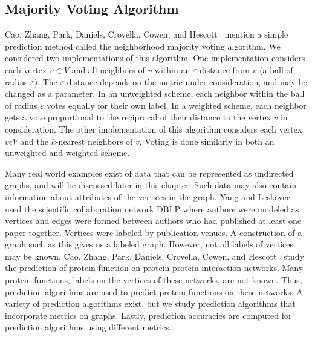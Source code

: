 \subsection{Majority Voting Algorithm}
Cao, Zhang, Park, Daniels, Crovella, Cowen, and Hescott~\cite{10.1371/journal.pone.0076339}
mention a simple prediction method called the neighborhood majority voting algorithm.
We considered two implementations of this algorithm. One implementation considers
each vertex $v \in V$ and all neighbors of $v$ within an $\varepsilon$ distance
from $v$ (a ball of radius $\varepsilon$). The $\varepsilon$ distance depends on the metric under consideration, and may be changed as a parameter. In an unweighted scheme, each neighbor within the ball of radius $\varepsilon$ votes equally for their own label. In a weighted scheme, each neighbor gets a vote proportional to the reciprocal of their distance to the vertex $v$ in consideration. The other implementation of this algorithm considers each vertex $v \epsilon V$ and the $k$-nearest neighbors of $v$. Voting is done similarly in both an unweighted and weighted scheme.




 Many real world examples exist of data that can be represented as undirected graphs, and will be discussed later in this chapter. Such data may also contain information about attributes of the vertices in the graph. Yang and Leskovec~\cite{DBLP:journals/corr/abs-1205-6233} used the scientific collaboration network DBLP where authors were modeled as vertices and edges were formed between authors who had published at least one paper together. Vertices were labeled by publication venues. A construction of a graph such as this gives us a labeled graph. However, not all labels of vertices may be known. Cao, Zhang, Park, Daniels, Crovella, Cowen, and Hescott~\cite{10.1371/journal.pone.0076339} study the prediction of protein function on protein-protein interaction networks. Many protein functions, labels on the vertices of these networks, are not known. Thus, prediction algorithms are used to predict protein functions on these networks. A variety of prediction algorithms exist, but we study prediction algorithms that incorporate metrics on graphs. Lastly, prediction accuracies are computed for prediction algorithms using different metrics.
